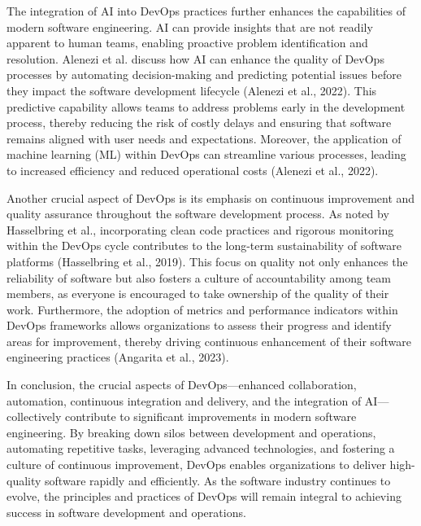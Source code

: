 The integration of AI into DevOps practices further enhances the capabilities of modern software engineering. AI can provide insights that are not readily apparent to human teams, enabling proactive problem identification and resolution. Alenezi et al. discuss how AI can enhance the quality of DevOps processes by automating decision-making and predicting potential issues before they impact the software development lifecycle (Alenezi et al., 2022). This predictive capability allows teams to address problems early in the development process, thereby reducing the risk of costly delays and ensuring that software remains aligned with user needs and expectations. Moreover, the application of machine learning (ML) within DevOps can streamline various processes, leading to increased efficiency and reduced operational costs (Alenezi et al., 2022).

Another crucial aspect of DevOps is its emphasis on continuous improvement and quality assurance throughout the software development process. As noted by Hasselbring et al., incorporating clean code practices and rigorous monitoring within the DevOps cycle contributes to the long-term sustainability of software platforms (Hasselbring et al., 2019). This focus on quality not only enhances the reliability of software but also fosters a culture of accountability among team members, as everyone is encouraged to take ownership of the quality of their work. Furthermore, the adoption of metrics and performance indicators within DevOps frameworks allows organizations to assess their progress and identify areas for improvement, thereby driving continuous enhancement of their software engineering practices (Angarita et al., 2023).

In conclusion, the crucial aspects of DevOps—enhanced collaboration, automation, continuous integration and delivery, and the integration of AI—collectively contribute to significant improvements in modern software engineering. By breaking down silos between development and operations, automating repetitive tasks, leveraging advanced technologies, and fostering a culture of continuous improvement, DevOps enables organizations to deliver high-quality software rapidly and efficiently. As the software industry continues to evolve, the principles and practices of DevOps will remain integral to achieving success in software development and operations.

